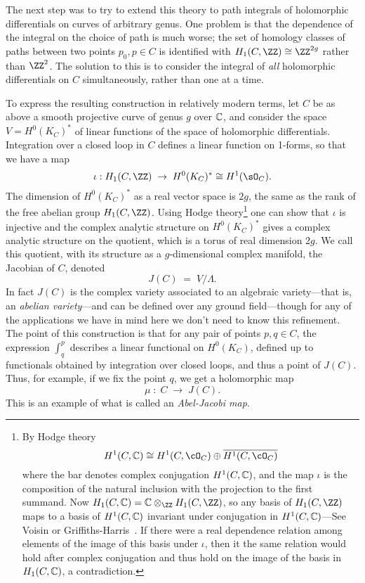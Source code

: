 The next step was to try to extend this theory to path integrals of holomorphic differentials on curves of arbitrary genus. One problem is that the dependence of the integral on the choice of path is much worse; the set of homology classes of paths between two points $p_0, p \in C$ is identified with $H_1(C,\ZZ) \cong \ZZ^{2g}$ rather than $\ZZ^2$. The solution to this is to consider the integral of \emph{all} holomorphic differentials on $C$ simultaneously, rather than one at a time.


To express the resulting construction in relatively modern terms, let $C$ be as above a smooth projective curve of genus $g$ over $\CC$, and consider the space $V = H^0(K_C)^*$ of linear functions of the space of holomorphic differentials. Integration over a closed loop in $C$ defines a linear function on 1-forms, so that we have a map
$$
\iota: H_1(C,\ZZ) \; \to \;  H^0(K_C)^* \cong H^1(\sO_C).
$$
The dimension of $H^0(K_C)^*$ as a real vector space is $2g$, the same as the rank of the free abelian group $H_1(C,\ZZ)$. 
Using  Hodge theory\footnote{By Hodge theory 
$$
H^1(C, \CC) \cong H^1(C, \cO_C) \oplus \overline{H^1(C, \cO_C)}
$$
where the bar denotes complex conjugation $H^1(C, \CC)$, and the map $\iota$ is the composition of 
 the natural inclusion with the projection to the first summand.
 Now
$H_1(C,\CC) = \CC\otimes_\ZZ H_1(C,\ZZ)$, so any basis of $H_1(C,\ZZ)$ maps to a basis of 
 $H^1(C, \CC)$ invariant under conjugation in $H^1(C, \CC)$---See Voisin \cite{} or Griffiths-Harris~\cite{}. 
  If there were a real dependence relation among elements 
 of the image of this basis under $\iota$, then it the same relation would hold after complex
 conjugation and thus hold on the image of the basis in $H_1(C,\CC)$, a contradiction. 
}
one can show that $\iota$ is injective and the complex analytic structure on $H^0(K_C)^*$ gives a complex analytic structure on the quotient, which is a torus of real dimension $2g$.  We call this quotient, with its structure as a $g$-dimensional complex manifold, the Jacobian of $C$, denoted
$$
J(C) \; = \; V/\Lambda.
$$
In fact $J(C)$ is the complex variety associated to an algebraic variety---that is, an \emph{abelian variety}---and can be defined over any ground field---though for any of the applications we have in mind here we don't need to know this refinement. The point of this construction is that for any pair of points $p, q \in C$, the expression $\int_q^p$ describes a linear functional on $H^0(K_C)$, defined up to functionals obtained by integration over closed loops, and thus a point of $J(C)$. Thus, for example, if we fix the point $q$, we get a holomorphic map
$$
\mu \; : \; C \; \to \; J(C).
$$
This is an example of what is called an \emph{Abel-Jacobi map}.

